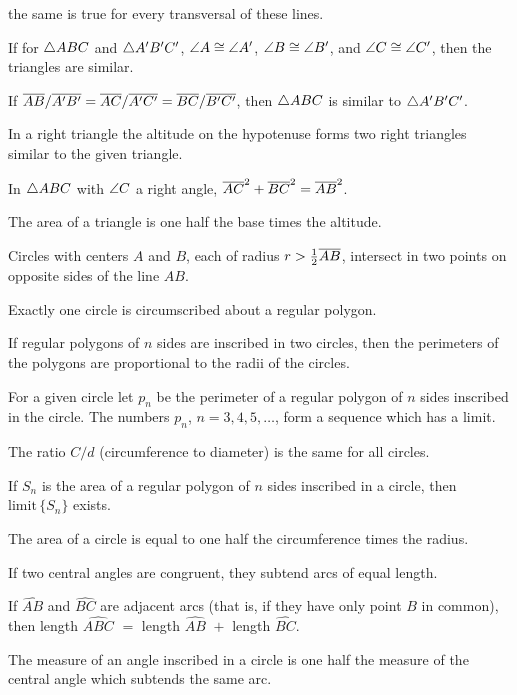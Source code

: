 \documentclass[11pt]{book}
\begin{document}
\begin{applist}
      the same is true for every transversal of these lines.
\item If for $\triangle ABC$ and $\triangle A'B'C'$, $\angle A \cong \angle A'$,
      $\angle B \cong \angle B'$, and $\angle C \cong \angle C'$, then the
      triangles are similar.
\item If $\overline{AB}/\overline{A'B'} = \overline{AC}/\overline{A'C'} = \overline{BC}/\overline{B'C'}$, then
      $\triangle ABC$ is similar to $\triangle A'B'C'$.
\item In a right triangle the altitude on the hypotenuse forms two right
      triangles similar to the given triangle.
\item In $\triangle ABC$ with $\angle C$ a right angle,
      $\overline{AC}^2 + \overline{BC}^2 = \overline{AB}^2$.
\item The area of a triangle is one half the base times the altitude.
\item Circles with centers $A$ and $B$, each of radius
      $r > \frac{1}{2}\overline{AB}$, intersect in two points on opposite sides of
      the line $AB$.
\item Exactly one circle is circumscribed about a regular polygon.
\item If regular polygons of $n$ sides are inscribed in two circles, then
      the perimeters of the polygons are proportional to the radii of the
      circles.
\item For a given circle let $p_n$ be the perimeter of a regular polygon of
      $n$ sides inscribed in the circle. The numbers $p_n$,
      $n = 3, 4, 5, \ldots$, form a sequence which has a limit.
\item The ratio $C/d$ (circumference to diameter) is the same for all
      circles.
\item If $S_n$ is the area of a regular polygon of $n$ sides inscribed in a
      circle, then $\mathrm{limit}\, \{S_n\}$ exists.
\item The area of a circle is equal to one half the circumference times the
      radius.
\item If two central angles are congruent, they subtend arcs of equal
      length.
\item If $\widehat{AB}$ and $\widehat{BC}$ are adjacent arcs (that is, if
      they have only point $B$ in common), then length $\widehat{ABC}$
      ${}={}$ length $\widehat{AB}$ ${}+{}$ length $\widehat{BC}$.
\item The measure of an angle inscribed in a circle is one half the measure
      of the central angle which subtends the same arc.
\end{applist}
\end{document}
